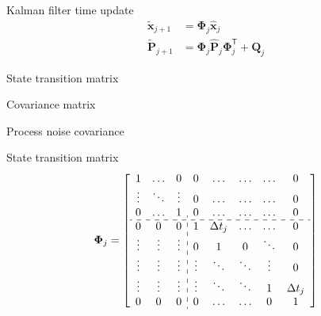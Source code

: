 \documentclass[14pt,table,t, c]{beamer}
\begin{document}
\begin{frame}{Kalman filter time update}
\begin{align*}
\tilde{\mathbf{x}}_{j+1} &= \mathbf{\Phi}_j \hat{\mathbf{x}}_j\\
\tilde{\mathbf{P}}_{j+1} &= \mathbf{\Phi}_j \hat{\mathbf{P}}_j \mathbf{\Phi}_j^\mathsf{T} + \mathbf{Q}_j
\end{align*}
\vspace*{\baselineskip}
\begin{description}[$\mathbf{\Phi}$]
\item[$\mathbf{\Phi}$] State transition matrix
\item[$\mathbf{P}$] Covariance matrix
\item[$\mathbf{Q}$] Process noise covariance
\end{description}
\end{frame}

\begin{frame}{State transition matrix}
\begin{align*}
\mathbf{\Phi}_j =
\left[\begin{array}{ccc:ccccc}
1      & \ldots & 0      & 0      & \ldots     & \ldots & \ldots & 0          \\
\vdots & \ddots & \vdots & 0      & \ldots     & \ldots & \ldots & 0          \\
0      & \ldots & 1      & 0      & \ldots     & \ldots & \ldots & 0          \\ \hdashline
0      & 0      & 0      & 1      & \Delta t_j & \ldots & \ldots & 0          \\
\vdots & \vdots & \vdots & 0      & 1          & 0      & \ddots & 0          \\
\vdots & \vdots & \vdots & \vdots & \ddots     & \ddots & \vdots & 0          \\
\vdots & \vdots & \vdots & \vdots & \ddots     & \ddots & 1      & \Delta t_j \\
0      & 0      & 0      & 0      & \ldots     & \ldots & 0      & 1
\end{array}\right]
\end{align*}
\end{frame}
\end{document}
